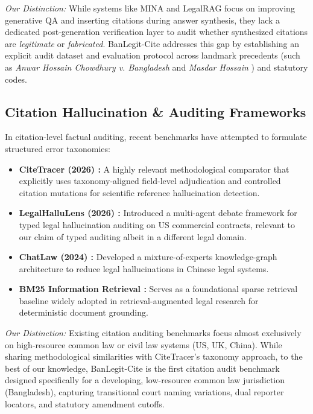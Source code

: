 \documentclass[conference]{IEEEtran}
\begin{document}
\textit{Our Distinction:} While systems like MINA and LegalRAG focus on improving generative QA and inserting citations during answer synthesis, they lack a dedicated post-generation verification layer to audit whether synthesized citations are \textit{legitimate} or \textit{fabricated}. BanLegit-Cite addresses this gap by establishing an explicit audit dataset and evaluation protocol across landmark precedents (such as \textit{Anwar Hossain Chowdhury v. Bangladesh} \cite{anwarhossain} and \textit{Masdar Hossain} \cite{masdarhossain}) and statutory codes.

\subsection{Citation Hallucination \& Auditing Frameworks}
In citation-level factual auditing, recent benchmarks have attempted to formulate structured error taxonomies:
\begin{itemize}
\item \textbf{CiteTracer (2026) \cite{citetracer2026}:} A highly relevant methodological comparator that explicitly uses taxonomy-aligned field-level adjudication and controlled citation mutations for scientific reference hallucination detection.
\item \textbf{LegalHalluLens (2026) \cite{legalhallulens2026}:} Introduced a multi-agent debate framework for typed legal hallucination auditing on US commercial contracts, relevant to our claim of typed auditing albeit in a different legal domain.
\item \textbf{ChatLaw (2024) \cite{chatlaw2024}:} Developed a mixture-of-experts knowledge-graph architecture to reduce legal hallucinations in Chinese legal systems.
\item \textbf{BM25 Information Retrieval \cite{bm25}:} Serves as a foundational sparse retrieval baseline widely adopted in retrieval-augmented legal research for deterministic document grounding.
\end{itemize}

\textit{Our Distinction:} Existing citation auditing benchmarks focus almost exclusively on high-resource common law or civil law systems (US, UK, China). While sharing methodological similarities with CiteTracer's taxonomy approach, to the best of our knowledge, BanLegit-Cite is the first citation audit benchmark designed specifically for a developing, low-resource common law jurisdiction (Bangladesh), capturing transitional court naming variations, dual reporter locators, and statutory amendment cutoffs.
\end{document}
